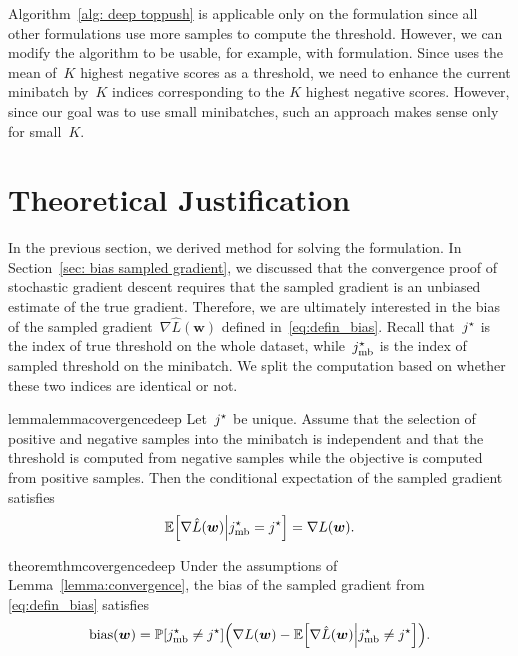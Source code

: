 \begin{note}\label{note: deep extension}
  Algorithm~\ref{alg: deep toppush} is applicable only on the \TopPush formulation since all other formulations use more samples to compute the threshold. However, we can modify the algorithm to be usable, for example, with \TopPushK formulation. Since \TopPushK uses the mean of~$K$ highest negative scores as a threshold, we need to enhance the current minibatch by~$K$ indices corresponding to the $K$ highest negative scores. However, since our goal was to use small minibatches, such an approach makes sense only for small~$K.$ 
\end{note}

\section{Theoretical Justification}\label{sec: biased threshold estimate}

In the previous section, we derived \DeepTopPush method for solving the \TopPush formulation. In Section~\ref{sec: bias sampled gradient}, we discussed that the convergence proof of stochastic gradient descent requires that the sampled gradient is an unbiased estimate of the true gradient. Therefore, we are ultimately interested in the bias of the sampled gradient~$\nabla \hat{L}(\bm{w})$ defined in~\eqref{eq:defin_bias}. Recall that~$j^{\star}$ is the index of true threshold on the whole dataset, while~$j^{\star}_{\text{mb}}$ is the index of sampled threshold on the minibatch. We split the computation based on whether these two indices are identical or not.

\begin{restatable}{lemma}{lemmacovergencedeep}\label{lemma:convergence}
  Let~$j^{\star}$ be unique. Assume that the selection of positive and negative samples into the minibatch is independent and that the threshold is computed from negative samples while the objective is computed from positive samples. Then the conditional expectation of the sampled gradient satisfies
  \begin{equation*}
    \EE\Brac[s]{\nabla \hat{L}(\bm{w}) \middle\vert\indmaxmb=\indmax} =  \nabla L(\bm{w}).
  \end{equation*}
\end{restatable}

\begin{restatable}{theorem}{thmcovergencedeep}\label{theorem:convergence}
  Under the assumptions of Lemma~\ref{lemma:convergence}, the bias of the sampled gradient from \eqref{eq:defin_bias} satisfies
  \begin{equation}\label{eq:comp_bias}
    \bias(\bm{w}) = \PP\Brac[s]{\indmaxmb\neq \indmax} \Brac{\nabla L(\bm{w}) - \EE\Brac[s]{\nabla \hat{L}(\bm{w}) \middle\vert \indmaxmb\neq \indmax}}.
  \end{equation}
\end{restatable}

